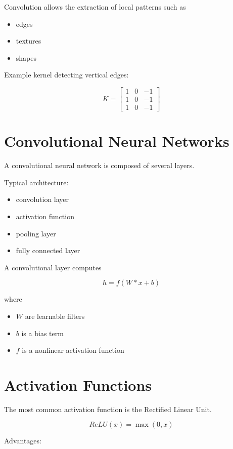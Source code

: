 ﻿\documentclass[11pt]{article}
\begin{document}
Convolution allows the extraction of local patterns such as

\begin{itemize}
\item edges
\item textures
\item shapes
\end{itemize}

Example kernel detecting vertical edges:

\[
K =
\begin{bmatrix}
1 & 0 & -1 \\
1 & 0 & -1 \\
1 & 0 & -1
\end{bmatrix}
\]

\section{Convolutional Neural Networks}

A convolutional neural network is composed of several layers.

Typical architecture:

\begin{itemize}
\item convolution layer
\item activation function
\item pooling layer
\item fully connected layer
\end{itemize}

A convolutional layer computes

\[
h = f(W * x + b)
\]

where

\begin{itemize}
\item $W$ are learnable filters
\item $b$ is a bias term
\item $f$ is a nonlinear activation function
\end{itemize}

\section{Activation Functions}

The most common activation function is the Rectified Linear Unit.

\[
ReLU(x) = \max(0,x)
\]

Advantages:
\end{document}
